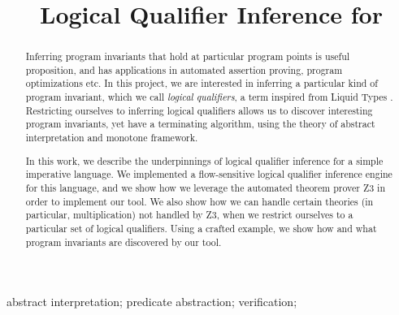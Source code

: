 \documentclass[10pt, conference, compsocconf]{IEEEtran}
\begin{document}
\title{\textbf{Logical Qualifier Inference for \lang}}

\author{
\and
{}
}


\maketitle


\begin{abstract}
Inferring program invariants that hold at particular program points is useful proposition, and has applications in automated assertion proving, program optimizations etc.  
In this project, we are interested in inferring a particular kind of program invariant, which we call \emph{logical qualifiers}, a term inspired from Liquid Types \cite{Rondon2008}.
Restricting ourselves to inferring logical qualifiers allows us to discover interesting program invariants, yet have a terminating algorithm, using the theory of abstract interpretation and monotone framework. 

In this work, we describe the underpinnings of logical qualifier inference for a simple imperative language.
We implemented a flow-sensitive logical qualifier inference engine for this language, and we show how we leverage the automated theorem prover Z3 \cite{Z3} in order to implement our tool.
We also show how we can handle certain theories (in particular, multiplication) not handled by Z3, when we restrict ourselves to a particular set of logical qualifiers. 
Using a crafted example, we show how and what program invariants are discovered by our tool. 

\end{abstract}

\begin{IEEEkeywords}
abstract interpretation; predicate abstraction; verification;

\end{IEEEkeywords}


\IEEEpeerreviewmaketitle
\end{document}
